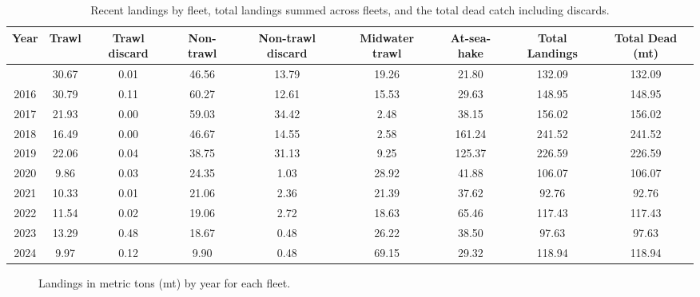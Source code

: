 \documentclass[
]{scrartcl}
\begin{document}
\begin{longtable}{ccccccccc}

\caption{\label{tbl-es-catches}Recent landings by fleet, total landings
summed across fleets, and the total dead catch including discards.}

\tabularnewline

\toprule
Year & Trawl & Trawl 
 discard & Non-trawl & Non-trawl 
 discard & Midwater 
 trawl & At-sea-hake & Total Landings & Total Dead (mt) \\ 
\midrule\addlinespace[2.5pt]
2015 & 30.67 & 0.01 & 46.56 & 13.79 & 19.26 & 21.80 & 132.09 & 132.09 \\ 
2016 & 30.79 & 0.11 & 60.27 & 12.61 & 15.53 & 29.63 & 148.95 & 148.95 \\ 
2017 & 21.93 & 0.00 & 59.03 & 34.42 & 2.48 & 38.15 & 156.02 & 156.02 \\ 
2018 & 16.49 & 0.00 & 46.67 & 14.55 & 2.58 & 161.24 & 241.52 & 241.52 \\ 
2019 & 22.06 & 0.04 & 38.75 & 31.13 & 9.25 & 125.37 & 226.59 & 226.59 \\ 
2020 & 9.86 & 0.03 & 24.35 & 1.03 & 28.92 & 41.88 & 106.07 & 106.07 \\ 
2021 & 10.33 & 0.01 & 21.06 & 2.36 & 21.39 & 37.62 & 92.76 & 92.76 \\ 
2022 & 11.54 & 0.02 & 19.06 & 2.72 & 18.63 & 65.46 & 117.43 & 117.43 \\ 
2023 & 13.29 & 0.48 & 18.67 & 0.48 & 26.22 & 38.50 & 97.63 & 97.63 \\ 
2024 & 9.97 & 0.12 & 9.90 & 0.48 & 69.15 & 29.32 & 118.94 & 118.94 \\ 
\bottomrule

\end{longtable}

\endgroup

\begin{figure}[H]


\caption{\label{fig-es-landings}Landings in metric tons (mt) by year for
each fleet.}

\end{figure}%
\end{document}

